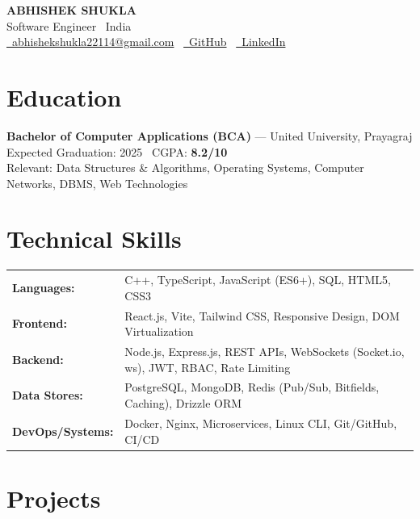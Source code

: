 \documentclass[10pt,a4paper]{article}
\begin{document}
\pagestyle{empty}

\begin{center}
    {\LARGE \textbf{ABHISHEK SHUKLA}} \\[4pt]
    {\color{muted} Software Engineer \textbullet\ India} \\[2pt]
    \href{mailto:abhishekshukla22114@gmail.com}{\faEnvelope\ abhishekshukla22114@gmail.com} \textbar\
    \href{https://github.com/abhishekshukla22114-rgb}{\faGithub\ GitHub} \textbar\
    \href{https://linkedin.com/in/abhishekshukla}{\faLinkedin\ LinkedIn}
\end{center}

\vspace{6pt}

\section{Education}
\textbf{Bachelor of Computer Applications (BCA)} — United University, Prayagraj \\
Expected Graduation: 2025 \textbar\ CGPA: \textbf{8.2/10} \\
\small Relevant: Data Structures \& Algorithms, Operating Systems, Computer Networks, DBMS, Web Technologies

\section{Technical Skills}
\begin{tabular}{@{}l l@{}}
\textbf{Languages:}      & C++, TypeScript, JavaScript (ES6+), SQL, HTML5, CSS3 \\
\textbf{Frontend:}       & React.js, Vite, Tailwind CSS, Responsive Design, DOM Virtualization \\
\textbf{Backend:}        & Node.js, Express.js, REST APIs, WebSockets (Socket.io, ws), JWT, RBAC, Rate Limiting \\
\textbf{Data Stores:}    & PostgreSQL, MongoDB, Redis (Pub/Sub, Bitfields, Caching), Drizzle ORM \\
\textbf{DevOps/Systems:} & Docker, Nginx, Microservices, Linux CLI, Git/GitHub, CI/CD \\
\end{tabular}

\section{Projects}
\end{document}
